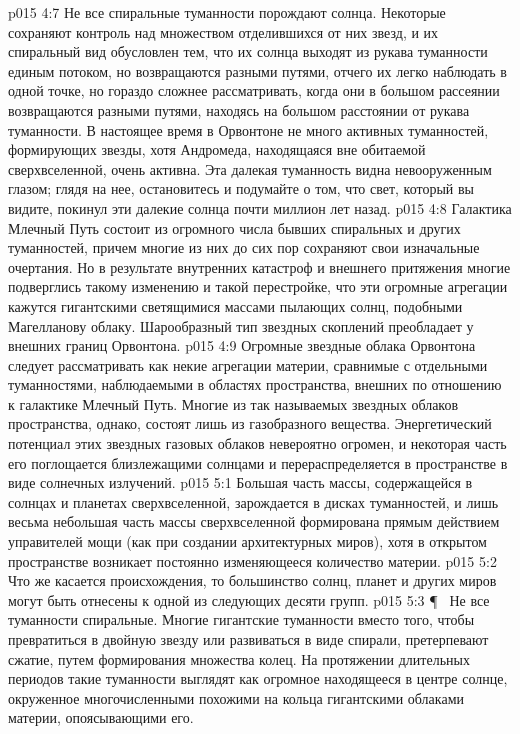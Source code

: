 \vs p015 4:7 Не все спиральные туманности порождают солнца. Некоторые сохраняют контроль над множеством отделившихся от них звезд, и их спиральный вид обусловлен тем, что их солнца выходят из рукава туманности единым потоком, но возвращаются разными путями, отчего их легко наблюдать в одной точке, но гораздо сложнее рассматривать, когда они в большом рассеянии возвращаются разными путями, находясь на большом расстоянии от рукава туманности. В настоящее время в Орвонтоне не много активных туманностей, формирующих звезды, хотя Андромеда, находящаяся вне обитаемой сверхвселенной, очень активна. Эта далекая туманность видна невооруженным глазом; глядя на нее, остановитесь и подумайте о том, что свет, который вы видите, покинул эти далекие солнца почти миллион лет назад.
\vs p015 4:8 Галактика Млечный Путь состоит из огромного числа бывших спиральных и других туманностей, причем многие из них до сих пор сохраняют свои изначальные очертания. Но в результате внутренних катастроф и внешнего притяжения многие подверглись такому изменению и такой перестройке, что эти огромные агрегации кажутся гигантскими светящимися массами пылающих солнц, подобными Магелланову облаку. Шарообразный тип звездных скоплений преобладает у внешних границ Орвонтона.
\vs p015 4:9 Огромные звездные облака Орвонтона следует рассматривать как некие агрегации материи, сравнимые с отдельными туманностями, наблюдаемыми в областях пространства, внешних по отношению к галактике Млечный Путь. Многие из так называемых звездных облаков пространства, однако, состоят лишь из газобразного вещества. Энергетический потенциал этих звездных газовых облаков невероятно огромен, и некоторая часть его поглощается близлежащими солнцами и перераспределяется в пространстве в виде солнечных излучений.
\vs p015 5:1 Большая часть массы, содержащейся в солнцах и планетах сверхвселенной, зарождается в дисках туманностей, и лишь весьма небольшая часть массы сверхвселенной формирована прямым действием управителей мощи (как при создании архитектурных миров), хотя в открытом пространстве возникает постоянно изменяющееся количество материи.
\vs p015 5:2 Что же касается происхождения, то большинство солнц, планет и других миров могут быть отнесены к одной из следующих десяти групп.
\vs p015 5:3 \P\ \bibnobreakspace {} Не все туманности спиральные. Многие гигантские туманности вместо того, чтобы превратиться в двойную звезду или развиваться в виде спирали, претерпевают сжатие, путем формирования множества колец. На протяжении длительных периодов такие туманности выглядят как огромное находящееся в центре солнце, окруженное многочисленными похожими на кольца гигантскими облаками материи, опоясывающими его.

